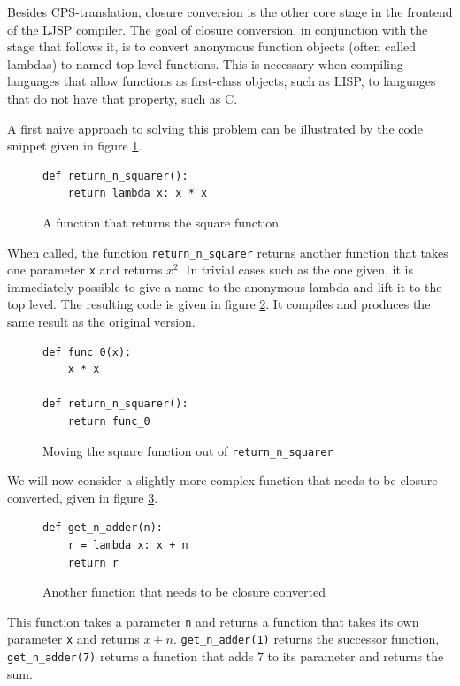 \documentclass[11pt]{report}
\begin{document}
Besides CPS-translation, closure conversion is the other core stage in the frontend of the LJSP compiler. The goal of closure conversion, in conjunction with the stage that follows it, is to convert anonymous function objects (often called lambdas) to named top-level functions. This is necessary when compiling languages that allow functions as first-class objects, such as LISP, to languages that do not have that property, such as C.

A first naive approach to solving this problem can be illustrated by the code snippet given in figure \ref{cc1}.

\begin{figure}[h!]
\begin{lstlisting}
def return_n_squarer():
    return lambda x: x * x
\end{lstlisting}
\caption{A function that returns the square function}
\label{cc1}
\end{figure}

When called, the function \texttt{return_n_squarer} returns another function that takes one parameter \texttt{x} and returns $x^2$. In trivial cases such as the one given, it is immediately possible to give a name to the anonymous lambda and lift it to the top level. The resulting code is given in figure \ref{cc2}. It compiles and produces the same result as the original version.

\begin{figure}[h!]
\begin{lstlisting}
def func_0(x):
    x * x
    
def return_n_squarer():
    return func_0
\end{lstlisting}
\caption{Moving the square function out of \texttt{return_n_squarer}}
\label{cc2}
\end{figure}

We will now consider a slightly more complex function that needs to be closure converted, given in figure \ref{cc3}.

\begin{figure}[ht]
\begin{lstlisting}
def get_n_adder(n):
    r = lambda x: x + n
    return r
\end{lstlisting}
\caption{Another function that needs to be closure converted}
\label{cc3}
\end{figure}

This function takes a parameter \texttt{n} and returns a function that takes its own parameter \texttt{x} and returns $x+n$. \texttt{get_n_adder(1)} returns the successor function, \texttt{get_n_adder(7)} returns a function that adds $7$ to its parameter and returns the sum.
\end{document}
